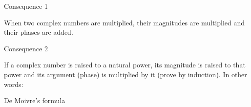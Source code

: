 



\begin{EMimportant}{}


\end{EMimportant}

\begin{EMremark}{Consequence 1}

When two complex numbers are multiplied, their magnitudes are multiplied and their phases are added.

\end{EMremark}

\begin{EMremark}{Consequence 2}

If a complex number is raised to a natural power, its magnitude is raised to that power and its argument (phase) is multiplied by it (prove by induction). In other words:

\end{EMremark}


\begin{EMimportant}{De Moivre's formula}


\end{EMimportant}

